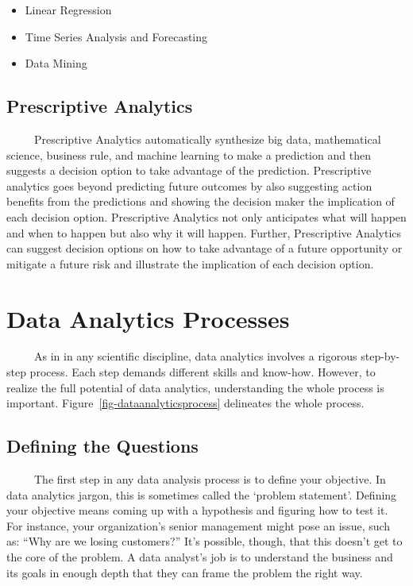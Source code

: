 \documentclass[
  letterpaper,
  DIV=11,
  numbers=noendperiod]{scrreprt}
\begin{document}
\begin{itemize}
\item
  Linear Regression
\item
  Time Series Analysis and Forecasting
\item
  Data Mining
\end{itemize}

\subsection{Prescriptive Analytics}\label{prescriptive-analytics}

~~~~~Prescriptive Analytics automatically synthesize big data,
mathematical science, business rule, and machine learning to make a
prediction and then suggests a decision option to take advantage of the
prediction. Prescriptive analytics goes beyond predicting future
outcomes by also suggesting action benefits from the predictions and
showing the decision maker the implication of each decision option.
Prescriptive Analytics not only anticipates what will happen and when to
happen but also why it will happen. Further, Prescriptive Analytics can
suggest decision options on how to take advantage of a future
opportunity or mitigate a future risk and illustrate the implication of
each decision option.

\section{Data Analytics Processes}\label{data-analytics-processes}

~~~~~As in in any scientific discipline, data analytics involves a
rigorous step-by-step process. Each step demands different skills and
know-how. However, to realize the full potential of data analytics,
understanding the whole process is important.
Figure~\ref{fig-dataanalyticsprocess} delineates the whole process.

\subsection{Defining the Questions}\label{defining-the-questions}

~~~~~The first step in any data analysis process is to define your
objective. In data analytics jargon, this is sometimes called the
`problem statement'. Defining your objective means coming up with a
hypothesis and figuring how to test it. For instance, your
organization's senior management might pose an issue, such as: ``Why are
we losing customers?'' It's possible, though, that this doesn't get to
the core of the problem. A data analyst's job is to understand the
business and its goals in enough depth that they can frame the problem
the right way.
\end{document}
